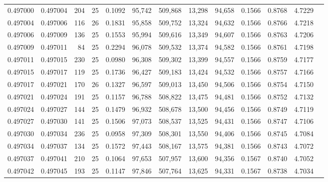 \begin{tabular}{rrrrrrrrrrrrr}
0.497000 & 0.497004 & 204 &  25 &                                     0.1092 &  95,742 & 509,868 &  13,298 &  94,658 & 0.1566 & 0.8768 & 4.7229 \\
0.497004 & 0.497006 & 116 &  26 &                                     0.1831 &  95,858 & 509,752 &  13,324 &  94,632 & 0.1566 & 0.8766 & 4.7218 \\
0.497006 & 0.497009 & 136 &  25 &                                     0.1553 &  95,994 & 509,616 &  13,349 &  94,607 & 0.1566 & 0.8763 & 4.7206 \\
0.497009 & 0.497011 &  84 &  25 &                                     0.2294 &  96,078 & 509,532 &  13,374 &  94,582 & 0.1566 & 0.8761 & 4.7198 \\
0.497011 & 0.497015 & 230 &  25 &                                     0.0980 &  96,308 & 509,302 &  13,399 &  94,557 & 0.1566 & 0.8759 & 4.7177 \\
0.497015 & 0.497017 & 119 &  25 &                                     0.1736 &  96,427 & 509,183 &  13,424 &  94,532 & 0.1566 & 0.8757 & 4.7166 \\
0.497017 & 0.497021 & 170 &  26 &                                     0.1327 &  96,597 & 509,013 &  13,450 &  94,506 & 0.1566 & 0.8754 & 4.7150 \\
0.497021 & 0.497024 & 191 &  25 &                                     0.1157 &  96,788 & 508,822 &  13,475 &  94,481 & 0.1566 & 0.8752 & 4.7132 \\
0.497024 & 0.497027 & 144 &  25 &                                     0.1479 &  96,932 & 508,678 &  13,500 &  94,456 & 0.1566 & 0.8749 & 4.7119 \\
0.497027 & 0.497030 & 141 &  25 &                                     0.1506 &  97,073 & 508,537 &  13,525 &  94,431 & 0.1566 & 0.8747 & 4.7106 \\
0.497030 & 0.497034 & 236 &  25 &                                     0.0958 &  97,309 & 508,301 &  13,550 &  94,406 & 0.1566 & 0.8745 & 4.7084 \\
0.497034 & 0.497037 & 134 &  25 &                                     0.1572 &  97,443 & 508,167 &  13,575 &  94,381 & 0.1566 & 0.8743 & 4.7072 \\
0.497037 & 0.497041 & 210 &  25 &                                     0.1064 &  97,653 & 507,957 &  13,600 &  94,356 & 0.1567 & 0.8740 & 4.7052 \\
0.497042 & 0.497045 & 193 &  25 &                                     0.1147 &  97,846 & 507,764 &  13,625 &  94,331 & 0.1567 & 0.8738 & 4.7034 \\

\end{tabular}
